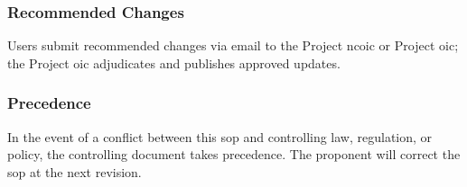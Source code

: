        \subsubsection{Recommended Changes}Users submit recommended changes via email to the Project \ac{ncoic} or Project \ac{oic}; the Project \ac{oic} adjudicates and publishes approved updates.
\\
        \subsubsection{Precedence}In the event of a conflict between this \ac{sop} and controlling law, regulation, or policy, the controlling document takes precedence. The proponent will correct the \ac{sop} at the next revision.
